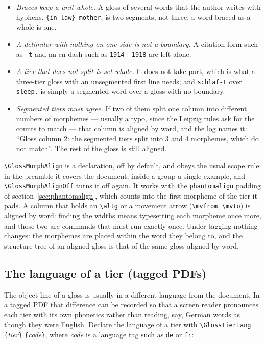 \documentclass[11pt,a4paper]{article}
\newcommand{\cs}[1]{\texttt{\textbackslash #1}}
\newcommand{\opt}[1]{\texttt{#1}}
\newcommand{\meta}[1]{\textrm{\itshape\textlangle#1\textrangle}}
\newcommand{\marg}[1]{\penalty300 \texttt{\{}\meta{#1}\texttt{\}}}
\begin{document}
\begin{itemize}
\item \emph{Braces keep a unit whole.} A gloss of several words that the
  author writes with hyphens, \verb|{in-law}-mother|, is two segments, not
  three; a word braced as a whole is one.
\item \emph{A delimiter with nothing on one side is not a boundary.} A
  citation form such as \texttt{-t} and an en dash such as
  \texttt{1914-{}-1918} are left alone.
\item \emph{A tier that does not split is set whole.} It does not take part,
  which is what a three-tier gloss with an unsegmented first line needs; and
  \texttt{schlaf-t} over \texttt{sleep.} is simply a segmented word
  over a gloss with no boundary.
\item \emph{Segmented tiers must agree.} If two of them split one column into
  different numbers of morphemes --- usually a typo, since the Leipzig rules
  ask for the counts to match --- that column is aligned by word, and the
  log names it:
  ``Gloss column 2: the segmented tiers split into 3 and 4 morphemes, which
  do not match''. The rest of the gloss is still aligned.
\end{itemize}

\cs{GlossMorphAlign} is a declaration, off by default, and obeys the usual
scope rule: in the preamble it covers the document, inside a group a single
example, and \cs{GlossMorphAlignOff} turns it off again. It works with the
\opt{phantomalign} padding of section~\ref{sec:phantomalign}, which counts
into the first morpheme of the tier it pads. A column that holds an
\cs{altg} or a movement arrow (\cs{mvfrom}, \cs{mvto}) is aligned by word:
finding the widths means typesetting each morpheme once more, and those two
are commands that must run exactly once. Under tagging nothing changes: the
morphemes are placed within the word they belong to, and the structure tree
of an aligned gloss is that of the same gloss aligned by word.

\subsection{The language of a tier (tagged PDFs)}\label{sec:glosslang}
The object line of a gloss is usually in a different language from the
document. In a tagged PDF that difference can be recorded so that a screen
reader pronounces each tier with its own phonetics rather than reading, say,
German words as though they were English. Declare the language of a tier
with \cs{GlossTierLang}\marg{tier}\marg{code}, where \meta{code} is a
language tag such as \texttt{de} or \texttt{fr}:
\end{document}
